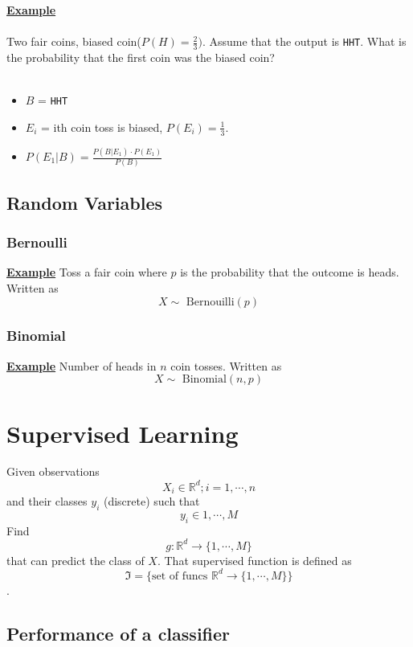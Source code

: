 \documentclass[12pt]{article}
\newcommand{\aside}[1]{\noindent\textbf{\underline{#1}}}
\begin{document}
\aside{Example}
\\ \\
Two fair coins, biased coin($P(H) = \frac{2}{3})$.  Assume that the output is \texttt{HHT}. What is the probability that the first coin was the biased coin?
\\ \\
\begin{itemize}
\item $B$ = \texttt{HHT}
\item $E_i$ = ith coin toss is biased, $P(E_i) = \frac{1}{3}$.
\item $P(E_1 | B) = \frac{P(B | E_1) \cdot P(E_1)}{P(B)}$
\end{itemize}

\subsection{Random Variables}

\subsubsection{Bernoulli}

\aside{Example} Toss a fair coin where $p$ is the probability that the outcome is heads. Written as \[X \sim\text{ Bernouilli}(p)\]

\subsubsection{Binomial}

\aside{Example} Number of heads in $n$ coin tosses. Written as \[X \sim\text{ Binomial}(n, p)\]

\section{Supervised Learning}

Given observations \[X_i \in \mathbb{R}^d; i=1, \cdots, n\] and their classes $y_i$ (discrete) such that \[y_i \in {1, \cdots, M}\]Find \[g : \mathbb{R}^d \rightarrow \{1, \cdots, M\}\] that can predict the class of $X$. That supervised function is defined as \[\Im = \{\text{set of funcs } \mathbb{R}^d \rightarrow \{1, \cdots, M\}\}\].

\subsection{Performance of a classifier}
\end{document}
